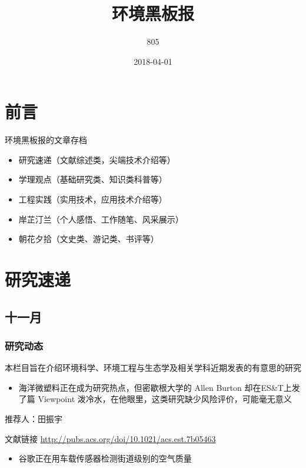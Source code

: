\documentclass[]{book}
\title{环境黑板报}
\author{805}
\date{2018-04-01}
\providecommand{\tightlist}{%
  \setlength{\itemsep}{0pt}\setlength{\parskip}{0pt}}
\begin{document}
\maketitle

{
\setcounter{tocdepth}{1}
\tableofcontents
}
\chapter{前言}

环境黑板报的文章存档

\begin{itemize}
\item
  研究速递（文献综述类，尖端技术介绍等）
\item
  学理观点（基础研究类、知识类科普等）
\item
  工程实践（实用技术，应用技术介绍等）
\item
  岸芷汀兰（个人感悟、工作随笔、风采展示）
\item
  朝花夕拾（文史类、游记类、书评等）
\end{itemize}

\chapter{研究速递}

\section*{十一月}

\subsection*{研究动态}

本栏目旨在介绍环境科学、环境工程与生态学及相关学科近期发表的有意思的研究

\begin{itemize}
\tightlist
\item
  海洋微塑料正在成为研究热点，但密歇根大学的 Allen Burton
  却在ES\&T上发了篇 Viewpoint
  泼冷水，在他眼里，这类研究缺少风险评价，可能毫无意义
\end{itemize}

推荐人：田振宇

文献链接 \url{http://pubs.acs.org/doi/10.1021/acs.est.7b05463}

\begin{itemize}
\tightlist
\item
  谷歌正在用车载传感器检测街道级别的空气质量
\end{itemize}
\end{document}
